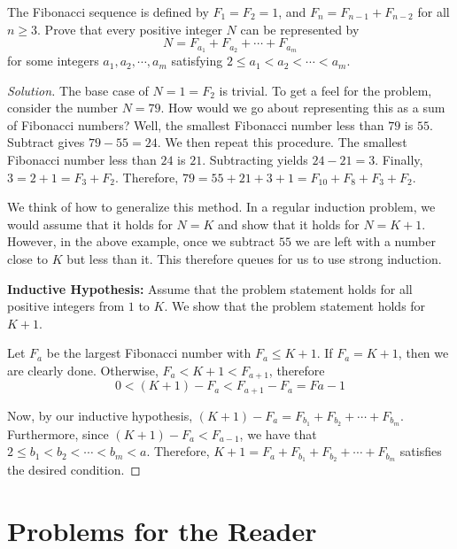 \documentclass[12pt,openany]{book}
\theoremstyle{definition}
\newenvironment{soln}{\begin{proof}[Solution]}{\end{proof}}
\theoremstyle{definition}
\begin{document}
\begin{exmp}  The Fibonacci sequence is defined by $F_{1}=F_2=1$, and $F_n=F_{n-1}+F_{n-2}$ for all $n\ge 3$.  Prove that every positive integer $N$ can be represented by $$N=F_{a_1}+F_{a_2}+\cdots+F_{a_m}$$ for some integers $a_1, a_2, \cdots, a_m$ satisfying $2\le a_1<a_2<\cdots<a_m$.  \end{exmp}
\begin{soln}  The base case of $N=1=F_2$ is trivial.  To get a feel for the problem, consider the number $N=79$.  How would we go about representing this as a sum of Fibonacci numbers?  Well, the smallest Fibonacci number less than $79$ is $55$.  Subtract gives $79-55=24$.  We then repeat this procedure.  The smallest Fibonacci number less than $24$ is $21$.  Subtracting yields $24-21=3$.  Finally, $3=2+1=F_3+F_2$.  Therefore, $79=55+21+3+1=F_{10}+F_8+F_3+F_2$.  

We think of how to generalize this method.  In a regular induction problem, we would assume that it holds for $N=K$ and show that it holds for $N=K+1$. However, in the above example, once we subtract $55$ we are left with a number close to $K$ but less than it.  This therefore queues for us to use strong induction.  

\textbf{Inductive Hypothesis:}  Assume that the problem statement holds for all positive integers from $1$ to $K$.  We show that the problem statement holds for $K+1$.

Let $F_a$ be the largest Fibonacci number with $F_a\le K+1$.  If $F_a=K+1$, then we are clearly done.  Otherwise, $F_a<K+1<F_{a+1}$, therefore $$0<(K+1)-F_a<F_{a+1}-F_a=F{a-1}$$

Now, by our inductive hypothesis, $(K+1)-F_a=F_{b_1}+F_{b_2}+\cdots+F_{b_m}$.  Furthermore, since $(K+1)-F_a<F_{a-1}$, we have that $2\le b_1<b_2<\cdots<b_m<a$.  Therefore, $K+1=F_a+F_{b_1}+F_{b_2}+\cdots+F_{b_m}$ satisfies the desired condition.  \end{soln}


\section{Problems for the Reader}
\end{document}
